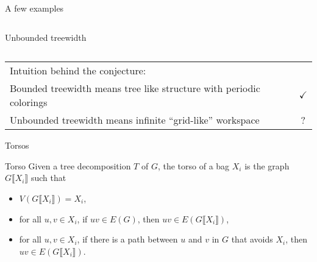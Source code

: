 \documentclass[11pt,dvipsnames,presentation,aspectratio=169]{beamer}
\begin{document}
\begin{frame}{A few examples}
\begin{columns}
\begin{column}{.3\linewidth}
      
      Unbounded treewidth
    \end{column}
  \end{columns}
  \pause
  \vspace{.5cm}
  \begin{tabular}{lc}
  Intuition behind the conjecture: &\\
  Bounded treewidth means tree like structure with periodic
    colorings&$\checkmark$\\
    \pause
  Unbounded treewidth means infinite ``grid-like'' workspace & ?
  \end{tabular}
\end{frame}

\begin{frame}{Torsos}
    \begin{exampleblock}{Torso}
    Given a tree decomposition $T$ of $G$, the torso of a bag $X_i$ is the graph
    $G\llbracket X_i \rrbracket$ such that
    \begin{itemize}
    \item $V(G\llbracket X_i \rrbracket) = X_i$,
    \item for all $u,v \in X_i$, if $uv \in E(G)$, then $uv\in E(G\llbracket X_i \rrbracket)$,
    \item for all $u,v \in X_i$, if there is a path between $u$ and $v$ in $G$
      that avoids $X_i$, then $uv \in E(G\llbracket X_i \rrbracket)$.
    \end{itemize}
  \end{exampleblock}

\end{frame}
\end{document}
